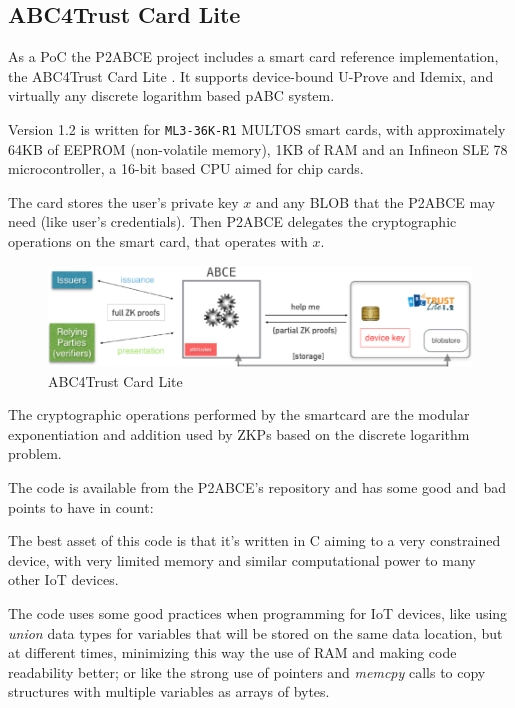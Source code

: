 \subsection{ABC4Trust Card Lite}

As a PoC the P2ABCE project includes a smart card reference implementation, the ABC4Trust Card Lite \citep{ABC4TCardLite}. It supports device-bound U-Prove and Idemix, and virtually any discrete logarithm based pABC system.

Version 1.2 is written for \texttt{ML3-36K-R1} MULTOS smart cards, with approximately 64KB of EEPROM (non-volatile memory), 1KB of RAM and an Infineon SLE 78 microcontroller, a 16-bit based CPU aimed for chip cards.

The card stores the user's private key $x$ and any \ac{BLOB} that the P2ABCE may need (like user's credentials). Then P2ABCE delegates the cryptographic operations on the smart card, that operates with $x$.

\begin{figure}[bth]
	\begin{center}
		\includegraphics[width=\linewidth]{gfx/ABC4TCardLite}
	\end{center}
	\caption{ABC4Trust Card Lite}
	\label{fig:ABC4TCardLite}
\end{figure}

The cryptographic operations performed by the smartcard are the modular exponentiation and addition used by ZKPs based on the discrete logarithm problem.

\hfil

The code is available from the P2ABCE's repository and has some good and bad points to have in count:

The best asset of this code is that it's written in C aiming to a very constrained device, with very limited memory and similar computational power to many other IoT devices.

The code uses some good practices when programming for IoT devices, like using \textit{union} data types for variables that will be stored on the same data location, but at different times, minimizing this way the use of RAM and making code readability better; or like the strong use of pointers and \textit{memcpy} calls to copy structures with multiple variables as arrays of bytes.


